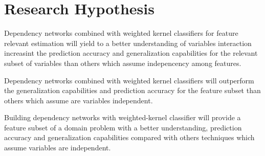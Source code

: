 
\section{Research Hypothesis}
\label{sec:ResHyp}

Dependency networks combined with weighted kernel classifiers for feature relevant estimation will yield to a better understanding of variables interaction increasint the prediction accuracy and generalization capabilities for the relevant subset of variables than others which assume indepencency among features.

Dependency networks combined with weighted kernel classifiers will outperform the generalization capabilities and prediction accuracy for the feature subset than others which assume are variables independent.

Building dependency networks with weighted-kernel classifier will provide a feature subset of a domain problem with a better understanding, prediction accuracy and generalization capabilities compared with others techniques which assume variables are independent.